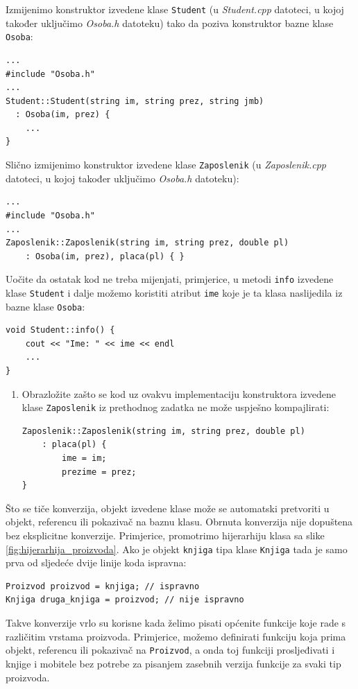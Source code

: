 \begin{rjesenje}
Izmijenimo konstruktor izvedene klase \texttt{Student}
(u \textit{Student.cpp} datoteci, u kojoj također
uključimo \textit{Osoba.h} datoteku)
tako da poziva konstruktor bazne klase \texttt{Osoba}:
\begin{verbatim}
...
#include "Osoba.h"
...
Student::Student(string im, string prez, string jmb)
  : Osoba(im, prez) {
    ...
}
\end{verbatim}

Slično izmijenimo konstruktor izvedene klase \texttt{Zaposlenik}
(u \textit{Zaposlenik.cpp} datoteci, u kojoj također
uključimo \textit{Osoba.h} datoteku):
\begin{verbatim}
...
#include "Osoba.h"
...
Zaposlenik::Zaposlenik(string im, string prez, double pl)
    : Osoba(im, prez), placa(pl) { }
\end{verbatim}

Uočite da ostatak kod ne treba mijenjati, primjerice,
u metodi \texttt{info} izvedene klase \texttt{Student}
i dalje možemo koristiti atribut 
\texttt{ime} koje je ta klasa naslijedila iz bazne klase \texttt{Osoba}:
\begin{verbatim}
void Student::info() {
    cout << "Ime: " << ime << endl
    ...
}
\end{verbatim}
\end{rjesenje}


\begin{razmisljanje}
    \begin{enumerate}
        \item 
        Obrazložite zašto se kod uz ovakvu implementaciju
        konstruktora izvedene klase \texttt{Zaposlenik} iz prethodnog zadatka ne može uspješno kompajlirati:
        \begin{verbatim}
Zaposlenik::Zaposlenik(string im, string prez, double pl)
    : placa(pl) {
        ime = im;
        prezime = prez;
}
        \end{verbatim}
    \end{enumerate}
\end{razmisljanje}


Što se tiče konverzija, objekt izvedene klase može se automatski pretvoriti u objekt, referencu ili pokazivač na baznu klasu. 
Obrnuta konverzija nije dopuštena bez eksplicitne konverzije.
Primjerice, promotrimo hijerarhiju klasa sa slike \ref{fig:hijerarhija_proizvoda}.
Ako je objekt \texttt{knjiga} tipa klase \texttt{Knjiga}
tada je samo prva od sljedeće dvije linije koda ispravna:
\begin{verbatim}
Proizvod proizvod = knjiga; // ispravno
Knjiga druga_knjiga = proizvod; // nije ispravno
\end{verbatim}
Takve konverzije vrlo su korisne kada želimo pisati općenite funkcije koje rade s različitim vrstama proizvoda. 
Primjerice, možemo definirati funkciju koja prima objekt, referencu ili pokazivač na \texttt{Proizvod}, 
a onda toj funkciji prosljeđivati i knjige i mobitele bez potrebe za pisanjem zasebnih verzija funkcije za svaki tip proizvoda.

